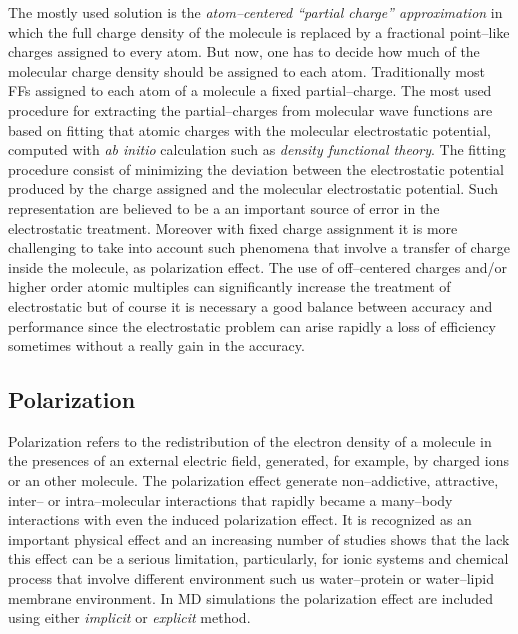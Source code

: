 The mostly used solution is the \textit{atom--centered ``partial charge'' approximation} in which the full charge density of the molecule is replaced by a fractional point--like charges assigned to every atom. But now, one has to decide how much of the molecular charge density should be assigned to each atom. Traditionally most \acp{FF} assigned to each atom of a molecule a fixed partial--charge. The most used procedure for extracting the partial--charges from molecular wave functions are based on fitting that atomic charges with the molecular electrostatic potential, computed with \textit{ab initio} calculation such as \textit{density functional theory}. The fitting procedure consist of minimizing the deviation between the electrostatic potential produced by the charge assigned and the molecular electrostatic potential. Such representation are believed to be a an important source of error in the electrostatic treatment. Moreover with fixed charge assignment it is more challenging to take into account such phenomena that involve a transfer of charge inside the molecule, as polarization effect. The use of off--centered charges and/or higher order atomic multiples can significantly increase the treatment of electrostatic but of course it is necessary a good balance between accuracy and performance since the electrostatic problem can arise rapidly a loss of efficiency sometimes without a really gain in the accuracy.

\subsection{Polarization}
\label{sec:polarization}
Polarization refers to the redistribution of the electron density of a molecule in the presences of an external electric field, generated, for example, by charged ions or an other molecule. The polarization effect generate non--addictive, attractive, inter-- or intra--molecular interactions that rapidly became a many--body interactions with even the induced polarization effect. It is recognized as an important physical effect and an increasing number of studies shows that the lack this effect can be a serious limitation, particularly, for ionic systems and chemical process that involve different environment such us water--protein or water--lipid membrane environment. In \ac{MD} simulations the polarization effect are included using either \textit{implicit} or \textit{explicit} method.

